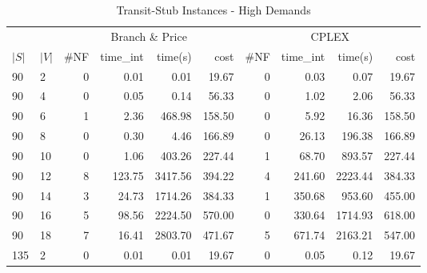 \begin{appendices}
\begin{table*}[h]
\scriptsize
\begin{center}
\caption{Transit-Stub Instances - High Demands}\label{tab:fullend}
\begin{tabular} {l l | r r r r | r r r r}
\hline
       &                                 &  \multicolumn{4}{c|}{Branch \& Price}                                & \multicolumn{4}{c}{CPLEX}                 \\
 $|S|$ & $|V|$                           &  \#NF  & time\_int     &  time(s)      &  cost            &  \#NF   &  time\_int   &  time(s)       &  cost       \\ 
\hline
90 & 2                                 &  0              &  0.01         &  0.01          &  19.67      &  0          &  0.03         &  0.07       &  19.67        \\ 
90 & 4                                 &  0              &  0.05         &  0.14          &  56.33      &  0          &  1.02         &  2.06       &  56.33        \\ 
90 & 6                                 &  1              &  2.36         &  468.98        &  158.50     &  0          &  5.92         &  16.36      &  158.50       \\ 
90 & 8                                 &  0              &  0.30         &  4.46          &  166.89     &  0          &  26.13        &  196.38     &  166.89       \\ 
90 & 10                                &  0              &  1.06         &  403.26        &  227.44     &  1          &  68.70        &  893.57     &  227.44       \\ 
90 & 12                                &  8              &  123.75       &  3417.56       &  394.22     &  4          &  241.60       &  2223.44    &  384.33       \\ 
90 & 14                                &  3              &  24.73        &  1714.26       &  384.33     &  1          &  350.68       &  953.60     &  455.00       \\ 
90 & 16                                &  5              &  98.56        &  2224.50       &  570.00     &  0          &  330.64       &  1714.93    &  618.00       \\ 
90 & 18                                &  7              &  16.41        &  2803.70       &  471.67     &  5          &  671.74       &  2163.21    &  547.00       \\ 
135 & 2                                &  0              &  0.01         &  0.01          &  19.67      &  0          &  0.05         &  0.12       &  19.67        \\ 

\end{tabular}
\end{center}
\end{table*}
\end{appendices}
